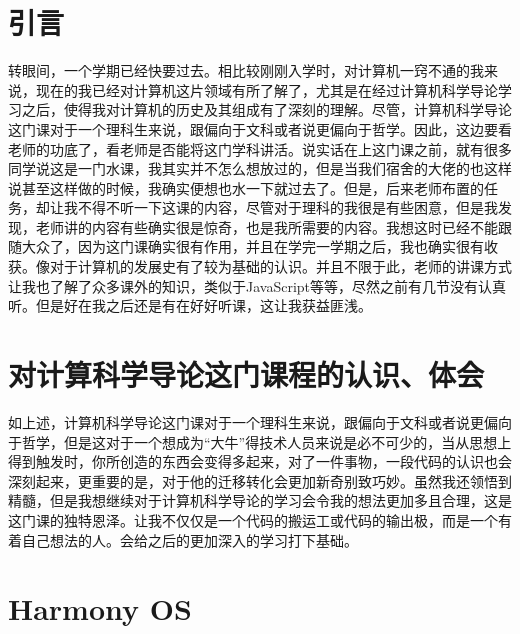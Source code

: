 \documentclass{article}
\begin{document}
\thispagestyle{empty}
\newpage
\setcounter{page}{1}
\section{引言}
转眼间，一个学期已经快要过去。相比较刚刚入学时，对计算机一窍不通的我来说，现在的我已经对计算机这片领域有所了解了，尤其是在经过计算机科学导论学习之后，使得我对计算机的历史及其组成有了深刻的理解。尽管，计算机科学导论这门课对于一个理科生来说，跟偏向于文科或者说更偏向于哲学。因此，这边要看老师的功底了，看老师是否能将这门学科讲活。说实话在上这门课之前，就有很多同学说这是一门水课，我其实并不怎么想放过的，但是当我们宿舍的大佬的也这样说甚至这样做的时候，我确实便想也水一下就过去了。但是，后来老师布置的任务，却让我不得不听一下这课的内容，尽管对于理科的我很是有些困意，但是我发现，老师讲的内容有些确实很是惊奇，也是我所需要的内容。我想这时已经不能跟随大众了，因为这门课确实很有作用，并且在学完一学期之后，我也确实很有收获。像对于计算机的发展史有了较为基础的认识。并且不限于此，老师的讲课方式让我也了解了众多课外的知识，类似于JavaScript等等，尽然之前有几节没有认真听。但是好在我之后还是有在好好听课，这让我获益匪浅。\par

\section{对计算科学导论这门课程的认识、体会}
如上述，计算机科学导论这门课对于一个理科生来说，跟偏向于文科或者说更偏向于哲学，但是这对于一个想成为“大牛”得技术人员来说是必不可少的，当从思想上得到触发时，你所创造的东西会变得多起来，对了一件事物，一段代码的认识也会深刻起来，更重要的是，对于他的迁移转化会更加新奇别致巧妙。虽然我还领悟到精髓，但是我想继续对于计算机科学导论的学习会令我的想法更加多且合理，这是这门课的独特恩泽。让我不仅仅是一个代码的搬运工或代码的输出极，而是一个有着自己想法的人。会给之后的更加深入的学习打下基础。\par

\section{Harmony OS}
\end{document}

